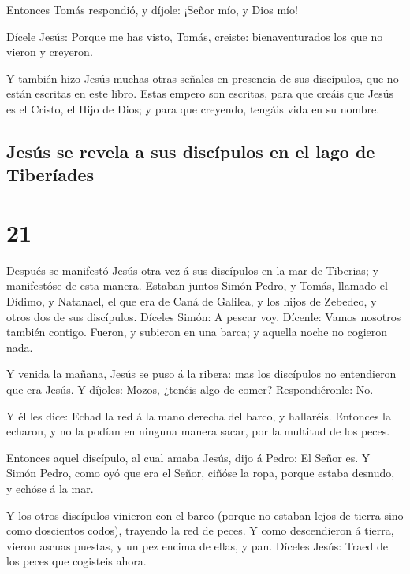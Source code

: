  Entonces Tomás respondió, y díjole: ¡Señor mío, y Dios
mío!

 Dícele Jesús: Porque me has visto, Tomás, creiste:
bienaventurados los que no vieron y creyeron.

 Y también hizo Jesús muchas otras señales en presencia de
sus discípulos, que no están escritas en este libro.  Estas
empero son escritas, para que creáis que Jesús es el Cristo, el Hijo de
Dios; y para que creyendo, tengáis vida en su nombre.

\hypertarget{jesuxfas-se-revela-a-sus-discuxedpulos-en-el-lago-de-tiberuxedades}{%
\subsection{Jesús se revela a sus discípulos en el lago de
Tiberíades}\label{jesuxfas-se-revela-a-sus-discuxedpulos-en-el-lago-de-tiberuxedades}}

\hypertarget{section-20}{%
\section{21}\label{section-20}}

 Después se manifestó Jesús otra vez á sus discípulos en la
mar de Tiberias; y manifestóse de esta manera.  Estaban
juntos Simón Pedro, y Tomás, llamado el Dídimo, y Natanael, el que era
de Caná de Galilea, y los hijos de Zebedeo, y otros dos de sus
discípulos.  Díceles Simón: A pescar voy. Dícenle: Vamos
nosotros también contigo. Fueron, y subieron en una barca; y aquella
noche no cogieron nada.

 Y venida la mañana, Jesús se puso á la ribera: mas los
discípulos no entendieron que era Jesús.  Y díjoles: Mozos,
¿tenéis algo de comer? Respondiéronle: No.~

 Y él les dice: Echad la red á la mano derecha del barco, y
hallaréis. Entonces la echaron, y no la podían en ninguna manera sacar,
por la multitud de los peces.

 Entonces aquel discípulo, al cual amaba Jesús, dijo á
Pedro: El Señor es. Y Simón Pedro, como oyó que era el Señor, ciñóse la
ropa, porque estaba desnudo, y echóse á la mar.

 Y los otros discípulos vinieron con el barco (porque no
estaban lejos de tierra sino como doscientos codos), trayendo la red de
peces.  Y como descendieron á tierra, vieron ascuas puestas,
y un pez encima de ellas, y pan.  Díceles Jesús: Traed de
los peces que cogisteis ahora.

